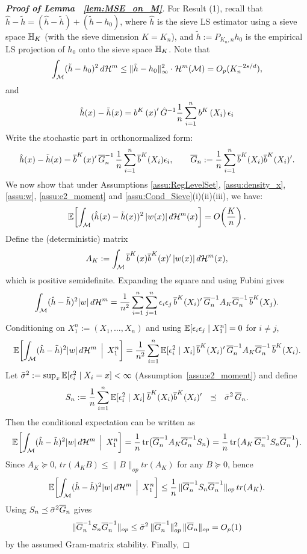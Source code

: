 \documentclass[12pt,american]{article}
\newcommand{\cH}{\mathcal{H}}
\DeclareMathOperator{\tr}{tr}
\theoremstyle{definition}
\theoremstyle{plain}
\theoremstyle{definition}
\theoremstyle{plain}
\theoremstyle{plain}
\theoremstyle{plain}
\theoremstyle{plain}
\theoremstyle{plain}
\newcommand{\E}{\mathbb{E}}
\begin{document}
\begin{proof}[\textbf{Proof of Lemma ~\ref{lem:MSE_on_M}}]
For Result (1), recall that $\hat{h} - \tilde{h}=(\hat{h}-\tilde{h})+(\tilde{h} - h_0)$, where $\hat h$ is the sieve LS estimator using a sieve space $\mathbb{H}_K$ (with the sieve dimension $K=K_n$), and $\tilde h :=P_{K_{n},n}h_0$ is the empirical LS projection of $h_0$ onto the sieve space $\mathbb{H}_K$. Note that
\[
\int_\cM (\tilde{h} - h_0)^2 \, d\cH^m \le \|\tilde{h} - h_0\|_\infty^2 \cdot \cH^m(\cM) = O_p(K_n^{-2s/d}),
\]
and
\[
\hat{h}(x) - \tilde{h}(x)= b^{K}\left(x\right)^{\prime}\hat{G}^{-1}\frac{1}{n}\sum_{i=1}^{n} b^{K}\left(X_{i}\right)\epsilon_i
\]
Write the stochastic part in orthonormalized form:
\[
\hat h(x)-\tilde h(x)
=\overline{b}^K(x)^{\prime}\,\overline{G}_n^{-1}\,\frac1n\sum_{i=1}^n \overline{b}^K(X_i)\epsilon_i,
\qquad
\overline{G}_n:=\frac1n\sum_{i=1}^n \overline{b}^K(X_i)\overline{b}^K(X_i)^{\prime}.
\]
We now show that under Assumptions \ref{assu:RegLevelSet}, \ref{assu:density_x}, \ref{assu:w}, \ref{assu:e2_moment} and \ref{assu:Cond_Sieve}(i)(ii)(iii), we have:
\[
\E\!\left[\int_\cM (\hat h(x)-\tilde h(x))^2\,|w(x)|\,d\cH^m(x)\right]
= O\!\left(\frac{K}{n}\right).
\]
Define the (deterministic) matrix
\[
A_K:=\int_\cM \ol b^K(x)\ol b^K(x)'\,|w(x)|\,d\cH^m(x),
\]
which is positive semidefinite. Expanding the square and using Fubini gives
\[
\int_\cM(\hat h-\tilde h)^2|w|\,d\cH^m
=\frac1{n^2}\sum_{i=1}^n\sum_{j=1}^n \e_i\e_j\,
\ol b^K(X_i)'\,\ol G_n^{-1}A_K\ol G_n^{-1}\,\ol b^K(X_j).
\]
Conditioning on $X_1^n:=(X_1,\dots,X_n)$ and using $\E[\e_i\e_j\mid X_1^n]=0$ for $i\neq j$,
\[
\E\!\left[\int_\cM(\hat h-\tilde h)^2|w|\,d\cH^m \,\Bigm|\, X_1^n\right]
=\frac1{n^2}\sum_{i=1}^n \E[\e_i^2\mid X_i]\,
\ol b^K(X_i)'\,\ol G_n^{-1}A_K\ol G_n^{-1}\,\ol b^K(X_i).
\]
Let $\bar\sigma^2:=\sup_x \E[\e_i^2\mid X_i=x]<\infty$ (Assumption~\ref{assu:e2_moment}) and define
\[
S_n:=\frac1n\sum_{i=1}^n \E[\e_i^2\mid X_i]\;\ol b^K(X_i)\ol b^K(X_i)' \ \ \preceq\ \ \bar\sigma^2\,\ol G_n.
\]
Then the conditional expectation can be written as
\[
\E\!\left[\int_\cM(\hat h-\tilde h)^2|w|\,d\cH^m \,\Bigm|\, X_1^n\right]
=\frac1n \tr\!\big(\ol G_n^{-1}A_K\ol G_n^{-1}S_n\big)
=\frac1n \tr\!\big(A_K\,\ol G_n^{-1}S_n\ol G_n^{-1}\big).
\]
Since $A_K\succeq 0$, $tr(A_KB)\le \|B\|_{op}tr(A_K)$ for any $B\succeq 0$, hence
\[
\E\!\left[\int_\cM(\hat h-\tilde h)^2|w|\,d\cH^m \,\Bigm|\, X_1^n\right]
\le \frac1n\,\|\ol G_n^{-1}S_n\ol G_n^{-1}\|_{op}\,tr(A_K).
\]
Using $S_n\preceq \bar\sigma^2\overline{G}_n$ gives
\[
\|\overline{G}_n^{-1}S_n\overline{G}_n^{-1}\|_{op}
\le \bar\sigma^2\,\|\overline{G}_n^{-1}\|_{op}^2\,\|\overline{G}_n\|_{op}
=O_p(1)
\]
by the assumed Gram-matrix stability. Finally,

\end{proof}
\end{document}
